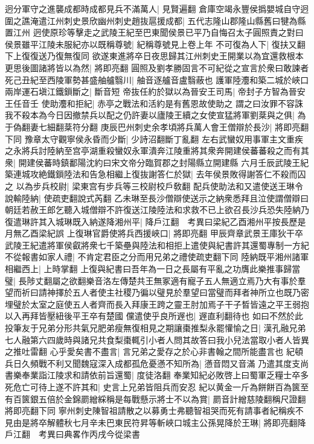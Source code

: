 迥分軍守之進襲成都時成都見兵不滿萬人|{
	見賢遍翻}
倉庫空竭永豐侯撝嬰城自守迥圍之譙淹遣江州刺史景欣幽州刺史趙抜扈援成都|{
	五代志隆山郡隆山縣舊曰犍為縣置江州}
迥使原珍等擊走之武陵王紀至巴東聞侯景已平乃自悔召太子圓照責之對曰侯景雖平江陵未服紀亦以既稱尊號|{
	紀稱尊號見上卷上年}
不可復為人下|{
	復扶又翻下上復復送乃復無復同}
欲遂東進將卒日夜思歸其江州刺史王開業以為宜還救根本更思後圖諸將皆以為然|{
	將即亮翻}
圓照及劉孝勝固言不可紀從之宣言於衆曰敢諫者死己丑紀至西陵軍勢甚盛舳艫翳川|{
	舳音逐艫音盧翳蔽也}
護軍陸灋和築二城於峽口兩岸運石塡江鐵鎻斷之|{
	斷音短}
帝抜任約於獄以為晉安王司馬|{
	帝封子方智為晉安王任音壬}
使助灋和拒紀|{
	赤亭之戰法和活約是有舊恩故使助之}
謂之曰汝罪不容誅我不殺本為今日因撤禁兵以配之仍許妻以廬陵王續之女使宣猛將軍劉棻與之俱|{
	為于偽翻妻七細翻棻符分翻}
庚辰巴州刺史余孝頃將兵萬人會王僧辯於長沙|{
	將即亮翻下同}
豫章太守觀寧侯永昏而少斷|{
	少詩沼翻斷丁亂翻}
左右武蠻奴用事軍主文重疾之永將兵討陸納至宫亭湖重殺蠻奴永軍潰奔江陵重將其衆奔開建侯蕃蕃殺之而有其衆|{
	開建侯蕃時鎮鄱陽沈約曰宋文帝分臨賀郡之封陽縣立開建縣}
六月壬辰武陵王紀築連城攻絶鐵鎻陸法和告急相繼上復抜謝答仁於獄|{
	去年侯景敗得謝答仁不殺而囚之}
以為步兵校尉|{
	梁東宫有步兵等三校尉校戶敎翻}
配兵使助法和又遣使送王琳令說輸陸納|{
	使疏吏翻說式芮翻}
乙未琳至長沙僧辯使送示之納衆悉拜且泣使謂僧辯曰朝廷若赦王郎乞聽入城僧辯不許復送江陵陸法和求救不已上欲召長沙兵恐失陸納乃復遣琳許其入城琳既入納遂降湘州平|{
	降戶江翻　考異曰梁紀乙酉湘州平按長歷是月無乙酉梁紀誤}
上復琳官爵使將兵西援峽口|{
	將即亮翻}
甲辰齊章武景王庫狄干卒　武陵王紀遣將軍侯叡將衆七千築壘與陸法和相拒上遣使與紀書許其還蜀專制一方紀不從報書如家人禮|{
	不肯定君臣之分而用兄弟之禮使疏吏翻下同}
陸納既平湘州諸軍相繼西上|{
	上時掌翻}
上復與紀書曰吾年為一日之長屬有平亂之功膺此樂推事歸當璧|{
	長陟丈翻屬之欲翻樂音洛左傳楚共王無冢適有寵子五人無適立焉乃大有事於羣望而祈曰請神擇於五人者使主社稷乃徧以璧見於羣望曰當璧而拜者神所立也既乃密埋璧於太室之庭使五人者齊而長入拜康王跨之靈王肘加焉子干子晳皆遠之平王弱抱以入再拜皆壓紐後平王卒有楚國}
儻遣使乎良所遟也|{
	遟直利翻待也}
如曰不然於此投筆友于兄弟分形共氣兄肥弟瘦無復相見之期讓棗推梨永罷懽愉之日|{
	漢孔融兄弟七人融第六四歲時與諸兄共食梨棗輒引小者人問其故答曰我小兒法當取小者人皆異之推吐雷翻}
心乎愛矣書不盡言|{
	言兄弟之愛存之於心非書翰之間所能盡言也}
紀頓兵日久頻戰不利又聞魏寇深入成都孤危憂懣不知所為|{
	懣音悶又音滿}
乃遣其度支尚書樂奉業詣江陵求和請依前旨還蜀|{
	度徒洛翻}
奉業知紀必敗啓上曰蜀軍乏糧士卒多死危亡可待上遂不許其和|{
	史言上兄弟皆阻兵而安忍}
紀以黄金一斤為餅餅百為篋至有百篋銀五倍於金錦罽繒綵稱是每戰懸示將士不以為賞|{
	罽音計繒慈陵翻稱尺證翻將即亮翻下同}
寧州刺史陳智祖請散之以募勇士弗聽智祖哭而死有請事者紀稱疾不見由是將卒解體秋七月辛未巴東民符昇等斬峽口城主公孫晃降於王琳|{
	將即亮翻降戶江翻　考異曰典畧作丙戌今從梁書}
